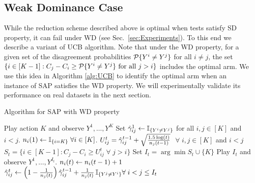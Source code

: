\subsection{Weak Dominance Case}
While the reduction scheme described above is optimal  when tests satisfy SD property, it can fail under WD (see Sec.~\ref{sec:Experiments}). To this end we describe a variant of UCB algorithm. 
Note that under the WD property, for a given set of the disagreement probabilities $\P\{Y^i \neq Y^j\}$ for all $i \neq j$, the set $\{i \in [K-1]: C_j - C_i \geq \P\{Y^i \neq Y^j\} \mbox{ for all } j>i\}$ includes the optimal arm. We use this idea in Algorithm \ref{alg:UCB} to identify the optimal arm when an instance of SAP satisfies the WD property. We will experimentally validate its performance on real datasets in the next section.
\begin{minipage}{0.48\textwidth}
		\begin{algorithm}[H]
			\caption{Algorithm for SAP with WD property} %
			\label{alg:UCB}
			\begin{algorithmic}[1]
				\STATE Play action $K$ and observe $Y^1,\dots,Y^K$
				\STATE Set $\hgamma_{ij}^1 \set \one{Y^i\ne Y^j}$ for all $i,j\in [K]$ and $i < j$.
				\STATE $n_i(1)\leftarrow \one{i=K} \; \forall i\in [K]$.
				\STATE $U_{ij}^t=\hgamma_{ij}^{t-1} + \sqrt{\frac{1.5\log(t)}{n_j(t-1)}}$  $\;\forall \; i,j \in [K]$ and $i<j$ \label{algo:UCB}
				\STATE $S_t=\{i \in [K-1]: C_j-C_i \geq U_{ij}^t \;\forall \;   j > i \}$ \label{algo:sort}
				\STATE Set $I_t= \arg \min S_t \cup \{K\} $
				\STATE Play $I_t$ and observe $Y^1,\dots,Y^{I_t}$.
				\STATE $n_i(t) \set n_i(t-1)+1$\\
				 \STATE $\hgamma_{ij}^t \set \left (1-\frac{1}{n_j(t)}\right )
				 \hgamma_{ij}^{t-1} + \frac{1}{n_j(t)} \,\one{Y^j\ne Y^i} \forall \; i<j \leq I_t$ \label{algo:Update}
				\ENDFOR
				\ENDFOR
			\end{algorithmic}
		\end{algorithm}
	\end{minipage}
	
